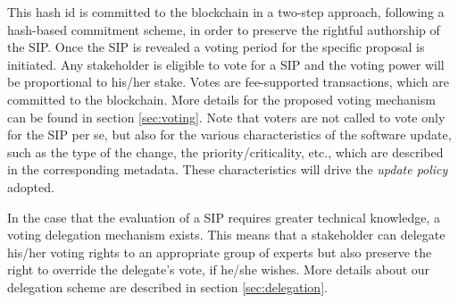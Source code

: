 This hash id is committed to the blockchain in a two-step approach, following a
hash-based commitment scheme, in order to preserve the rightful authorship of
the SIP.
Once the SIP is revealed a voting period for the specific proposal is
initiated. Any stakeholder is eligible to vote for a SIP and the voting power
will be proportional to his/her stake. Votes are fee-supported transactions,
which are committed to the blockchain. More details for the proposed voting
mechanism can be found in section \ref{sec:voting}. Note that voters are not
called to vote only for the SIP per se, but also for the various
characteristics of the software update, such as the type of the change, the
priority/criticality, etc., which are described in the corresponding metadata.
These characteristics will drive the \emph{update policy} adopted.

In the case that the evaluation of a SIP requires greater technical knowledge,
a voting delegation mechanism exists. This means that a stakeholder can
delegate his/her voting rights to an appropriate group of experts but also
preserve the right to override the delegate's vote, if he/she wishes. More
details about our delegation scheme are described in section
\ref{sec:delegation}.

